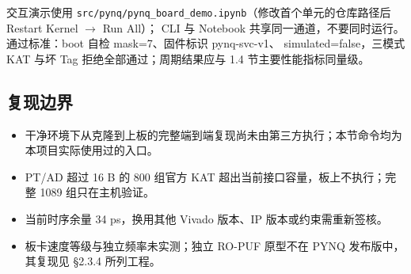 交互演示使用 \texttt{src/\allowbreak{}pynq/\allowbreak{}pynq\_\allowbreak{}board\_\allowbreak{}demo.\allowbreak{}ipynb}（修改首个单元的仓库路径后 Restart Kernel $\rightarrow$ Run All）； CLI 与 Notebook 共享同一通道，不要同时运行。通过标准：boot 自检 mask=7、固件标识 pynq-svc-v1、 simulated=false，三模式 KAT 与坏 Tag 拒绝全部通过；周期结果应与 1.4 节主要性能指标同量级。

\Needspace{85pt}

\subsection{复现边界}

\begin{itemize}
\tightlist
\item
  干净环境下从克隆到上板的完整端到端复现尚未由第三方执行；本节命令均为本项目实际使用过的入口。
\item
  PT/AD 超过 16 B 的 800 组官方 KAT 超出当前接口容量，板上不执行；完整 1089 组只在主机验证。
\item
  当前时序余量 34 ps，换用其他 Vivado 版本、IP 版本或约束需重新签核。
\item
  板卡速度等级与独立频率未实测；独立 RO-PUF 原型不在 PYNQ 发布版中，其复现见 §2.3.4 所列工程。
\end{itemize}
